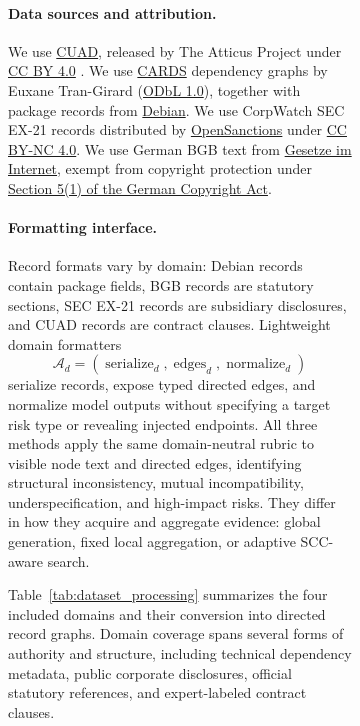 \documentclass[11pt]{article}
\newcommand{\scc}{SCC}
\begin{document}
\begin{figure}[!t]
\begin{figure}[!t]
\begin{revadded}
\paragraph{Data sources and attribution.}
We use \href{https://www.atticusprojectai.org/cuad}{CUAD}, released by The Atticus Project under \href{https://creativecommons.org/licenses/by/4.0/}{CC BY 4.0} \citep{hendrycks2021cuad}.
We use \href{https://doi.org/10.5281/zenodo.14245890}{CARDS} dependency graphs by Euxane Tran-Girard (\href{https://opendatacommons.org/licenses/odbl/1-0/}{ODbL 1.0}), together with package records from \href{https://www.debian.org/}{Debian}.
We use CorpWatch SEC EX-21 records distributed by \href{https://www.opensanctions.org/datasets/us_corpwatch/}{OpenSanctions} under \href{https://creativecommons.org/licenses/by-nc/4.0/}{CC BY-NC 4.0}.
We use German BGB text from \href{https://www.gesetze-im-internet.de/}{Gesetze im Internet}, exempt from copyright protection under \href{https://www.gesetze-im-internet.de/urhg/__5.html}{Section 5(1) of the German Copyright Act}.
\end{revadded}


\paragraph{Formatting interface.}
Record formats vary by domain: Debian records contain package fields, BGB records are statutory sections, SEC EX-21 records are subsidiary disclosures, and CUAD records are contract clauses. Lightweight domain formatters
\begin{equation}
    \mathcal{A}_d=(\operatorname{serialize}_d,\operatorname{edges}_d,\operatorname{normalize}_d)
\end{equation}
serialize records, expose typed directed edges, and normalize model outputs without specifying a target risk type or revealing injected endpoints. All three methods apply the same domain-neutral rubric to visible node text and directed edges, identifying structural inconsistency, mutual incompatibility, underspecification, and high-impact risks. They differ in how they acquire and aggregate evidence: global generation, fixed local aggregation, or adaptive \scc{}-aware search.



Table~\ref{tab:dataset_processing} summarizes the four included domains and their conversion into directed record graphs.  Domain coverage spans several forms of authority and structure, including technical dependency metadata, public corporate disclosures, official statutory references, and expert-labeled contract clauses.


\end{figure}
\end{figure}
\end{document}
